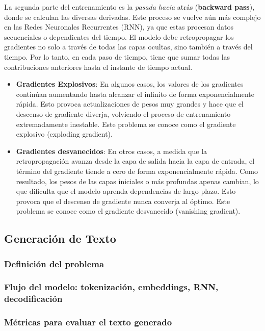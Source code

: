 \documentclass{article}
\begin{document}
La segunda parte del entrenamiento es la \textit{pasada hacia} atrás (\textbf{backward pass}), donde se calculan las diversas derivadas. Este proceso se vuelve aún más complejo en las Redes Neuronales Recurrentes (RNN), ya que estas procesan datos secuenciales o dependientes del tiempo. El modelo debe retropropagar los gradientes no solo a través de todas las capas ocultas, sino también a través del tiempo. Por lo tanto, en cada paso de tiempo, tiene que sumar todas las contribuciones anteriores hasta el instante de tiempo actual. \\

\begin{itemize}
    \item \textbf{Gradientes Explosivos}: En algunos casos, los valores de los gradientes continúan aumentando hasta alcanzar el infinito de forma exponencialmente rápida. Esto provoca actualizaciones de pesos muy grandes y hace que el descenso de gradiente diverja, volviendo el proceso de entrenamiento extremadamente inestable. Este problema se conoce como el gradiente explosivo (exploding gradient).
    \item \textbf{Gradientes desvanecidos}: En otros casos, a medida que la retropropagación avanza desde la capa de salida hacia la capa de entrada, el término del gradiente tiende a cero de forma exponencialmente rápida. Como resultado, los pesos de las capas iniciales o más profundas apenas cambian, lo que dificulta que el modelo aprenda dependencias de largo plazo. Esto provoca que el descenso de gradiente nunca converja al óptimo. Este problema se conoce como el gradiente desvanecido (vanishing gradient).
\end{itemize}

\newpage
\subsection{Generación de Texto}
\subsubsection{Definición del problema}
\subsubsection{Flujo del modelo: tokenización, embeddings, RNN, decodificación}
\subsubsection{Métricas para evaluar el texto generado}
\end{document}
